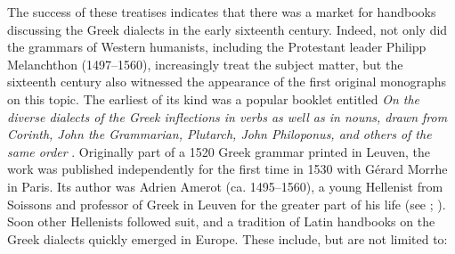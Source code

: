 The success of these treatises indicates that there was a market for handbooks discussing the Greek dialects in the early sixteenth century. Indeed, not only did the grammars of Western humanists, including the Protestant leader Philipp Melanchthon (1497–1560), increasingly treat the subject matter, but the sixteenth century also witnessed the appearance of the first original monographs on this topic. The earliest of its kind was a popular booklet entitled \textit{On the diverse dialects of the Greek inflections in verbs as well as in nouns, drawn from Corinth, John the Grammarian, Plutarch, John Philoponus, and others of the same order} \citep{Amerot1530}. Originally part of a 1520 Greek grammar printed in Leuven, the work was published independently for the first time in 1530 with Gérard Morrhe in Paris. Its author was Adrien Amerot (ca. 1495–1560), a young Hellenist from Soissons and professor of Greek in Leuven for the greater part of his life (see \citealt{Hummel1999}; \citealt{VanRooyFcb}). Soon other Hellenists followed suit, and a tradition of Latin handbooks on the Greek dialects quickly emerged in Europe. These include, but are not limited to:

